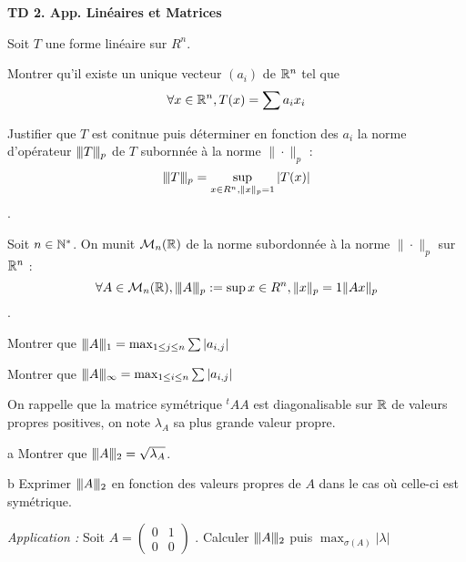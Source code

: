 \documentclass{report}
\begin{document}
\begin{center}
    \Huge{\textbf{TD 2. App. Linéaires et Matrices}}
\end{center}
\bigskip

\begin{exo}
    Soit \(T\) une forme linéaire sur \(R^n\).
    \begin{q}{1}
        Montrer qu'il existe un unique vecteur \((a_i)\) de \(\mathbb{R}^n\) tel que
        \[\forall x\in\mathbb{R}^n, T(x)=\sum a_ix_i\]
    \end{q}
    \begin{q}{2}
        Justifier que \(T\) est conitnue puis déterminer en fonction des \(a_i\)
        la norme d'opérateur \(\vert\kern-0.25ex\vert\kern-0.25ex\vert T \vert\kern-0.25ex\vert\kern-0.25ex\vert_p\) de \(T\) subornnée à
        la norme \(\|\cdot\|_p\) : \[\vert\kern-0.25ex\vert\kern-0.25ex\vert T \vert\kern-0.25ex\vert\kern-0.25ex\vert_p=\sup_{x\in R^n
        ,\|x\|_p=1}|T(x)|\].
    \end{q}
\end{exo}

\begin{exo}
    Soit \(n\in\mathbb{N}^*\). On munit \(\mathcal{M}_n(\mathbb{R})\) de la norme subordonnée à la norme
    \(\|\cdot\|_p\) sur \(\mathbb{R}^n\) :
    \[\forall A\in\mathcal{M}_n(\mathbb{R}), \vert\kern-0.25ex\vert\kern-0.25ex\vert A \vert\kern-0.25ex\vert\kern-0.25ex\vert_p := \sup{x\in R^n,\|x\|_p=1} \|Ax\|_p\].
    \begin{q}{1}
        Montrer que \(\vert\kern-0.25ex\vert\kern-0.25ex\vert A \vert\kern-0.25ex\vert\kern-0.25ex\vert_1=\max_{1\leq j\leq n} \sum |a_{i,j}|\)
    \end{q}
    \begin{q}{2}
        Montrer que \(\vert\kern-0.25ex\vert\kern-0.25ex\vert A \vert\kern-0.25ex\vert\kern-0.25ex\vert_\infty=\max_{1\leq i\leq n} \sum |a_{i,j}|\)
    \end{q}
    \begin{q}{3}
        On rappelle que la matrice symétrique \(^tAA\) est diagonalisable
        sur \(\mathbb{R}\) de valeurs propres positives, on note \(\lambda_A\) sa
        plus grande valeur propre.
        \begin{q}{a}
            Montrer que \(\vert\kern-0.25ex\vert\kern-0.25ex\vert A \vert\kern-0.25ex\vert\kern-0.25ex\vert_2=\sqrt{\lambda_A}\).
        \end{q}
        \begin{q}{b}
            Exprimer \(\vert\kern-0.25ex\vert\kern-0.25ex\vert A \vert\kern-0.25ex\vert\kern-0.25ex\vert_2\) en fonction des valeurs propres de
            \(A\) dans le cas où celle-ci est symétrique.
        \end{q}
    \end{q}
    \begin{q}{4}
        \textit{Application :} Soit \(A=\begin{pmatrix}0&1\\0&0\end{pmatrix}\)
        . Calculer \(\vert\kern-0.25ex\vert\kern-0.25ex\vert A \vert\kern-0.25ex\vert\kern-0.25ex\vert_2\) puis \(\max_{\sigma(A)}|\lambda|\)
    \end{q}
\end{exo}
\end{document}
